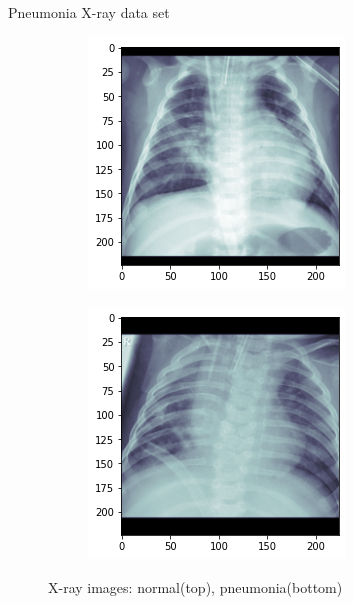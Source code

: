 \begin{frame}{Pneumonia X-ray data set}
\begin{figure}[htbp!]
\begin{subfigure}[b]{0.3\textwidth}
     \end{subfigure} 
     \hfill
     \begin{subfigure}[b]{0.3\textwidth}
         \centering
         \includegraphics[width=\textwidth]{Images/xray_pneumonia2.png}
     \end{subfigure}
     \hfill
     \begin{subfigure}[b]{0.3\textwidth}
         \centering
         \includegraphics[width=\textwidth]{Images/xray_pneumonia5.png}
     \end{subfigure}
     \caption{X-ray images: normal(top), pneumonia(bottom)}
\end{figure}
\end{frame}

